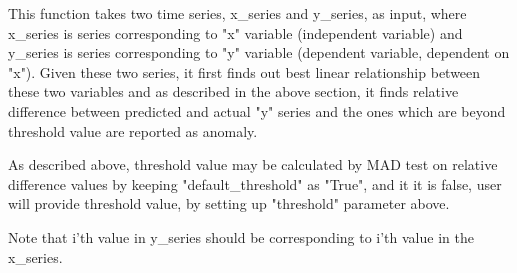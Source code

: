 This function takes two time series, x\_series and y\_series, as input, where x\_series is series corresponding to "x" variable (independent variable) and y\_series is series corresponding to "y" variable (dependent variable, dependent on "x"). Given these two series, it first finds out best linear relationship between these two variables and as described in the above section, it finds relative difference between predicted and actual "y" series and the ones which are beyond threshold value are reported as anomaly. 

As described above, threshold value may be calculated by MAD test on relative difference values by keeping "default\_threshold" as "True", and it it is false, user will provide threshold value, by setting up "threshold" parameter above.

Note that i'th value in y\_series should be corresponding to i'th value in the x\_series.

